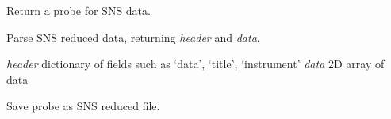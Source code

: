 \documentclass[letterpaper,10pt,english]{sphinxmanual}
\begin{document}

\begin{fulllineitems}
\label{api/snsdata:refl1d.snsdata.has_columns}
\end{fulllineitems}


\begin{fulllineitems}
\label{api/snsdata:refl1d.snsdata.intensity_from_spline}
\end{fulllineitems}


\begin{fulllineitems}
\label{api/snsdata:refl1d.snsdata.load}
Return a probe for SNS data.

\end{fulllineitems}


\begin{fulllineitems}
\label{api/snsdata:refl1d.snsdata.parse_file}
Parse SNS reduced data, returning \emph{header} and \emph{data}.

\emph{header} dictionary of fields such as `data', `title', `instrument'
\emph{data} 2D array of data

\end{fulllineitems}


\begin{fulllineitems}
\label{api/snsdata:refl1d.snsdata.write_file}
Save probe as SNS reduced file.

\end{fulllineitems}
\end{document}
